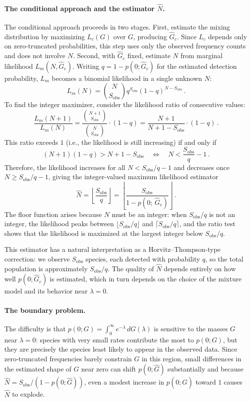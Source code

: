 ﻿\documentclass{article}
\begin{document}
\paragraph{The conditional approach and the estimator $\hat{N}$.}
The conditional approach proceeds in two stages. First, estimate the mixing distribution by maximizing $L_c(G)$ over $G$, producing $\hat{G}_c$. Since $L_c$ depends only on zero-truncated probabilities, this step uses only the observed frequency counts and does not involve $N$. Second, with $\hat{G}_c$ fixed, estimate $N$ from marginal likelihood $L_m(N, \hat{G}_c)$. Writing $q = 1 - p(0;\hat{G}_c)$ for the estimated detection probability, $L_m$ becomes a binomial likelihood in a single unknown $N$:
\[
L_m(N) = \binom{N}{S_{\mathrm{obs}}} q^{S_{\mathrm{obs}}} (1-q)^{N - S_{\mathrm{obs}}}\,.
\]
To find the integer maximizer, consider the likelihood ratio of consecutive values:
\[
\frac{L_m(N+1)}{L_m(N)} 
= \frac{\binom{N+1}{S_{\mathrm{obs}}}}{\binom{N}{S_{\mathrm{obs}}}} 
  \cdot (1-q)
= \frac{N+1}{N+1-S_{\mathrm{obs}}} \cdot (1-q)\,.
\]
This ratio exceeds $1$ (i.e., the likelihood is still increasing) if and only if
\[
(N+1)(1-q) > N + 1 - S_{\mathrm{obs}} 
\quad\Longleftrightarrow\quad 
N < \frac{S_{\mathrm{obs}}}{q} - 1\,.
\]
Therefore, the likelihood increases for all $N < S_{\mathrm{obs}}/q - 1$ and decreases once $N \geq S_{\mathrm{obs}}/q - 1$, giving the integer-valued maximum likelihood estimator
\begin{equation}\label{eq:N_hat_derived}
    \hat{N} = \left\lfloor \frac{S_{\mathrm{obs}}}{q} \right\rfloor 
    = \left\lfloor \frac{S_{\mathrm{obs}}}{1 - p(0;\,\hat{G}_c)} \right\rfloor\,.
\end{equation}
The floor function arises because $N$ must be an integer: when $S_{\mathrm{obs}}/q$ is not an integer, the likelihood peaks between $\lfloor S_{\mathrm{obs}}/q \rfloor$ and $\lceil S_{\mathrm{obs}}/q \rceil$, and the ratio test shows that the likelihood is maximized at the largest integer below $S_{\mathrm{obs}}/q$.

This estimator has a natural interpretation as a Horvitz--Thompson-type correction: we observe $S_{\mathrm{obs}}$ species, each detected with probability $q$, so the total population is approximately $S_{\mathrm{obs}} / q$. The quality of $\hat{N}$ depends entirely on how well $p(0;\hat{G}_c)$ is estimated, which in turn depends on the choice of the mixture model and its behavior near $\lambda = 0$.

\paragraph{The boundary problem.}
The difficulty is that $p(0;G) = \int_0^\infty e^{-\lambda}\,dG(\lambda)$ is sensitive to the masses $G$ near $\lambda = 0$: species with very small rates contribute the most to $p(0;G)$, but they are precisely the species least likely to appear in the observed data. Since zero-truncated frequencies barely constrain $G$ in this region, small differences in the estimated shape of $G$ near zero can shift $p(0;\hat{G})$ substantially and because $\hat{N} = S_{\mathrm{obs}}/(1 - p(0;\hat{G}))$, even a modest increase in $p(0;\hat{G})$ toward $1$ causes $\hat{N}$ to explode.
\end{document}
